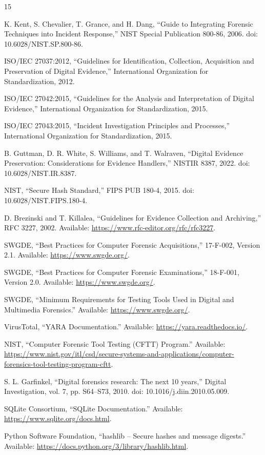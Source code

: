\documentclass[conference]{IEEEtran}
\begin{document}
\begin{thebibliography}{15}

K. Kent, S. Chevalier, T. Grance, and H. Dang, ``Guide to Integrating Forensic Techniques into Incident Response,'' NIST Special Publication 800-86, 2006. doi: 10.6028/NIST.SP.800-86.

ISO/IEC 27037:2012, ``Guidelines for Identification, Collection, Acquisition and Preservation of Digital Evidence,'' International Organization for Standardization, 2012.

ISO/IEC 27042:2015, ``Guidelines for the Analysis and Interpretation of Digital Evidence,'' International Organization for Standardization, 2015.

ISO/IEC 27043:2015, ``Incident Investigation Principles and Processes,'' International Organization for Standardization, 2015.

B. Guttman, D. R. White, S. Williams, and T. Walraven, ``Digital Evidence Preservation: Considerations for Evidence Handlers,'' NISTIR 8387, 2022. doi: 10.6028/NIST.IR.8387.

NIST, ``Secure Hash Standard,'' FIPS PUB 180-4, 2015. doi: 10.6028/NIST.FIPS.180-4.

D. Brezinski and T. Killalea, ``Guidelines for Evidence Collection and Archiving,'' RFC 3227, 2002. Available: \url{https://www.rfc-editor.org/rfc/rfc3227}.

SWGDE, ``Best Practices for Computer Forensic Acquisitions,'' 17-F-002, Version 2.1. Available: \url{https://www.swgde.org/}.

SWGDE, ``Best Practices for Computer Forensic Examinations,'' 18-F-001, Version 2.0. Available: \url{https://www.swgde.org/}.

SWGDE, ``Minimum Requirements for Testing Tools Used in Digital and Multimedia Forensics.'' Available: \url{https://www.swgde.org/}.

VirusTotal, ``YARA Documentation.'' Available: \url{https://yara.readthedocs.io/}.

NIST, ``Computer Forensic Tool Testing (CFTT) Program.'' Available: \url{https://www.nist.gov/itl/csd/secure-systems-and-applications/computer-forensics-tool-testing-program-cftt}.

S. L. Garfinkel, ``Digital forensics research: The next 10 years,'' Digital Investigation, vol. 7, pp. S64--S73, 2010. doi: 10.1016/j.diin.2010.05.009.

SQLite Consortium, ``SQLite Documentation.'' Available: \url{https://www.sqlite.org/docs.html}.

Python Software Foundation, ``hashlib -- Secure hashes and message digests.'' Available: \url{https://docs.python.org/3/library/hashlib.html}.

\end{thebibliography}
\end{document}
